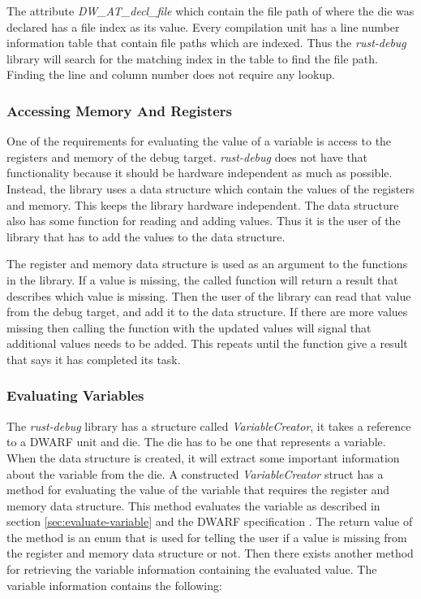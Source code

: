 The attribute  \emph{DW\_AT\_decl\_file} which contain the file path of where the \gls{die} was declared has a file index as its value.
Every compilation unit has a line number information table that contain file paths which are indexed.
Thus the \emph{rust-debug} library will search for the matching index in the table to find the file path.
Finding the line and column number does not require any lookup.


\subsubsection{Accessing Memory And Registers}
One of the requirements for evaluating the value of a variable is access to the registers and memory of the debug target.
\emph{rust-debug} does not have that functionality because it should be hardware independent as much as possible.
Instead, the library uses a data structure which contain the values of the registers and memory.
This keeps the library hardware independent.
The data structure also has some function for reading and adding values.
Thus it is the user of the library that has to add the values to the data structure.


The register and memory data structure is used as an argument to the functions in the library.
If a value is missing, the called function will return a result that describes which value is missing.
Then the user of the library can read that value from the debug target, and add it to the data structure.
If there are more values missing then calling the function with the updated values will signal that additional values needs to be added.
This repeats until the function give a result that says it has completed its task.


\subsubsection{Evaluating Variables} \label{sec:ievalvar}
The \emph{rust-debug} library has a structure called \emph{VariableCreator}, it takes a reference to a \gls{DWARF} unit and \gls{die}.
The \gls{die} has to be one that represents a variable.
When the data structure is created, it will extract some important information about the variable from the \gls{die}. A constructed \emph{VariableCreator} struct has a method for evaluating the value of the variable that requires the register and memory data structure.
This method evaluates the variable as described in section \ref{sec:evaluate-variable} and the \gls{DWARF} specification \cite{dwarf}.
The return value of the method is an enum that is used for telling the user if a value is missing from the register and memory data structure or not.
Then there exists another method for retrieving the variable information containing the evaluated value.
The variable information contains the following:

